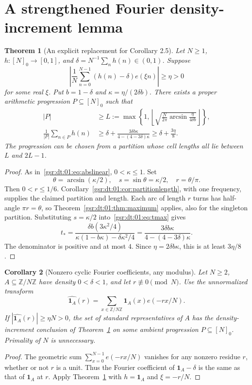 \documentclass[11pt,letterpaper]{article}
\numberwithin{equation}{section}
\newtheorem{theorem}{Theorem}[section]
\newtheorem{corollary}[theorem]{Corollary}
\theoremstyle{definition}
\theoremstyle{remark}
\newcommand{\Z}{\mathbb Z}
\newcommand{\one}{\mathbf 1}
\newcommand{\1}{\mathbf 1}
\newcommand{\floor}[1]{\left\lfloor#1\right\rfloor}
\newcommand{\srctag}[1]{\texorpdfstring{\enspace\textup{[#1]}}{ [#1]}}
\newcommand{\srcnote}[2]{\par\noindent{\small\textit{Source #1, delivered #2.}}\par}
\begin{document}
\section[{A strengthened Fourier density-increment lemma\srctag{01}}]{A strengthened Fourier density-increment lemma}\label{gsr:dt:01:sec:d7}\label{gsr:dt:01:sec:fourier}
\srcnote{01}{Section 7}
\begin{theorem}[An explicit replacement for Corollary 2.5]\label{gsr:dt:01:thm:fourier}
Let $N\ge1$, $h:[N]_0\to[0,1]$, and
$\delta=N^{-1}\sum_nh(n)\in(0,1)$. Suppose
\[
 \left|\frac1N\sum_{n=0}^{N-1}(h(n)-\delta)e(\xi n)\right|\ge\eta>0
\]
for some real $\xi$. Put $b=1-\delta$ and
$\kappa=\eta/(2\delta b)$. There exists a proper arithmetic progression
$P\subseteq[N]_0$ such that
\begin{align}
 |P|&\ge L:=\max\left\{1,
 \floor{\sqrt{\frac{N}{2\pi}\arcsin\frac{\eta}{4\delta b}}}
 \right\},\label{gsr:dt:01:eq:finalL}\\
 \frac1{|P|}\sum_{n\in P}h(n)
 &\ge\delta+\frac{3\delta b\kappa}{4-(4-3\delta)\kappa}
 \ge\delta+\frac{3\eta}{8}.\label{gsr:dt:01:eq:finalincrement}
\end{align}
The progression can be chosen from a partition whose cell lengths all lie
between $L$ and $2L-1$.
\end{theorem}
\begin{proof}
As in~\eqref{gsr:dt:01:eq:abslinear}, $0<\kappa\le1$. Set
\[
 \theta=\arcsin(\kappa/2),\quad s=\sin\theta=\kappa/2,
 \quad r=\theta/\pi.
\]
Then $0<r\le1/6$. Corollary~\ref{gsr:dt:01:cor:partitionlength}, with one
frequency, supplies the claimed partition and length. Each arc of length
$r$ turns has half-angle $\pi r=\theta$, so Theorem~\ref{gsr:dt:01:thm:maximum}
applies, also for the singleton partition. Substituting $s=\kappa/2$
into~\eqref{gsr:dt:01:eq:tmax} gives
\[
 t_*=
 \frac{\delta b(3\kappa^2/4)}
      {\kappa(1-b\kappa)-\delta\kappa^2/4}
 =\frac{3\delta b\kappa}{4-(4-3\delta)\kappa}.
\]
The denominator is positive and at most $4$. Since
$\eta=2\delta b\kappa$, this is at least $3\eta/8$.
\end{proof}

\begin{corollary}[Nonzero cyclic Fourier coefficients, any modulus]
\label{gsr:dt:01:cor:cyclic}
Let $N\ge2$, $A\subseteq\Z/N\Z$ have density $0<\delta<1$, and let
$r\not\equiv0\pmod N$. Use the unnormalized transform
\[
 \widehat{\one_A}(r)=\sum_{x\in\Z/N\Z}\one_A(x)e(-rx/N).
\]
If $|\widehat{\one_A}(r)|\ge\eta N>0$, the set of standard representatives
of $A$ has the density-increment conclusion of Theorem~\ref{gsr:dt:01:thm:fourier}
on some ambient progression $P\subseteq[N]_0$. Primality of $N$ is unnecessary.
\end{corollary}
\begin{proof}
The geometric sum $\sum_{x=0}^{N-1}e(-rx/N)$ vanishes for any nonzero
residue $r$, whether or not $r$ is a unit. Thus the Fourier coefficient
of $\one_A-\delta$ is the same as that of $\one_A$ at $r$.
Apply Theorem~\ref{gsr:dt:01:thm:fourier} with $h=\one_A$ and $\xi=-r/N$.
\end{proof}
\end{document}
